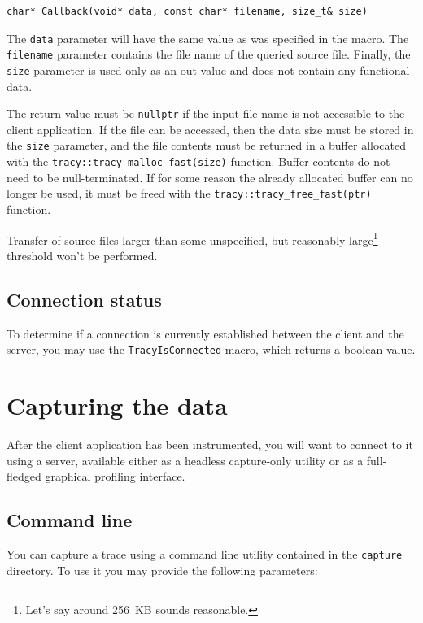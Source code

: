 \documentclass[hidelinks,titlepage,a4paper,twoside]{article}
\begin{document}
\begin{lstlisting}
char* Callback(void* data, const char* filename, size_t& size)
\end{lstlisting}

The \texttt{data} parameter will have the same value as was specified in the macro. The \texttt{filename} parameter contains the file name of the queried source file. Finally, the \texttt{size} parameter is used only as an out-value and does not contain any functional data.

The return value must be \texttt{nullptr} if the input file name is not accessible to the client application. If the file can be accessed, then the data size must be stored in the \texttt{size} parameter, and the file contents must be returned in a buffer allocated with the \texttt{tracy::tracy\_malloc\_fast(size)} function. Buffer contents do not need to be null-terminated. If for some reason the already allocated buffer can no longer be used, it must be freed with the \texttt{tracy::tracy\_free\_fast(ptr)} function.

Transfer of source files larger than some unspecified, but reasonably large\footnote{Let's say around 256~KB sounds reasonable.} threshold won't be performed.

\subsection{Connection status}
\label{connectionstatus}

To determine if a connection is currently established between the client and the server, you may use the \texttt{TracyIsConnected} macro, which returns a boolean value.

\section{Capturing the data}
\label{capturing}

After the client application has been instrumented, you will want to connect to it using a server, available either as a headless capture-only utility or as a full-fledged graphical profiling interface.

\subsection{Command line}

You can capture a trace using a command line utility contained in the \texttt{capture} directory. To use it you may provide the following parameters:
\end{document}
